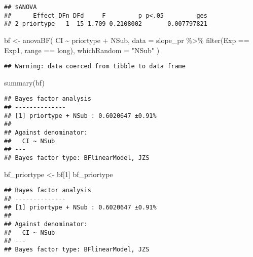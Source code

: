 \documentclass[
]{article}
\newenvironment{Shaded}{\begin{snugshade}}{\end{snugshade}}
\newcommand{\AttributeTok}[1]{\textcolor[rgb]{0.77,0.63,0.00}{#1}}
\newcommand{\DecValTok}[1]{\textcolor[rgb]{0.00,0.00,0.81}{#1}}
\newcommand{\FunctionTok}[1]{\textcolor[rgb]{0.00,0.00,0.00}{#1}}
\newcommand{\NormalTok}[1]{#1}
\newcommand{\OtherTok}[1]{\textcolor[rgb]{0.56,0.35,0.01}{#1}}
\newcommand{\SpecialCharTok}[1]{\textcolor[rgb]{0.00,0.00,0.00}{#1}}
\newcommand{\StringTok}[1]{\textcolor[rgb]{0.31,0.60,0.02}{#1}}
\begin{document}
\begin{verbatim}
## $ANOVA
##      Effect DFn DFd     F         p p<.05         ges
## 2 priortype   1  15 1.709 0.2108002       0.007797821
\end{verbatim}

\begin{Shaded}
\begin{Highlighting}[]
\NormalTok{bf }\OtherTok{\textless{}{-}} \FunctionTok{anovaBF}\NormalTok{( CI }\SpecialCharTok{\textasciitilde{}}\NormalTok{ priortype }\SpecialCharTok{+}\NormalTok{ NSub, }\AttributeTok{data =}\NormalTok{  slope\_pr }\SpecialCharTok{\%\textgreater{}\%} \FunctionTok{filter}\NormalTok{(Exp }\SpecialCharTok{==} \StringTok{\textquotesingle{}Exp1\textquotesingle{}}\NormalTok{, range }\SpecialCharTok{==} \StringTok{\textquotesingle{}long\textquotesingle{}}\NormalTok{), }\AttributeTok{whichRandom =} \StringTok{"NSub"}\NormalTok{ ) }
\end{Highlighting}
\end{Shaded}

\begin{verbatim}
## Warning: data coerced from tibble to data frame
\end{verbatim}

\begin{Shaded}
\begin{Highlighting}[]
\FunctionTok{summary}\NormalTok{(bf)}
\end{Highlighting}
\end{Shaded}

\begin{verbatim}
## Bayes factor analysis
## --------------
## [1] priortype + NSub : 0.6020647 ±0.91%
## 
## Against denominator:
##   CI ~ NSub 
## ---
## Bayes factor type: BFlinearModel, JZS
\end{verbatim}

\begin{Shaded}
\begin{Highlighting}[]
\NormalTok{ bf\_priortype }\OtherTok{\textless{}{-}}\NormalTok{ bf[}\DecValTok{1}\NormalTok{]}
\NormalTok{ bf\_priortype}
\end{Highlighting}
\end{Shaded}

\begin{verbatim}
## Bayes factor analysis
## --------------
## [1] priortype + NSub : 0.6020647 ±0.91%
## 
## Against denominator:
##   CI ~ NSub 
## ---
## Bayes factor type: BFlinearModel, JZS
\end{verbatim}
\end{document}
